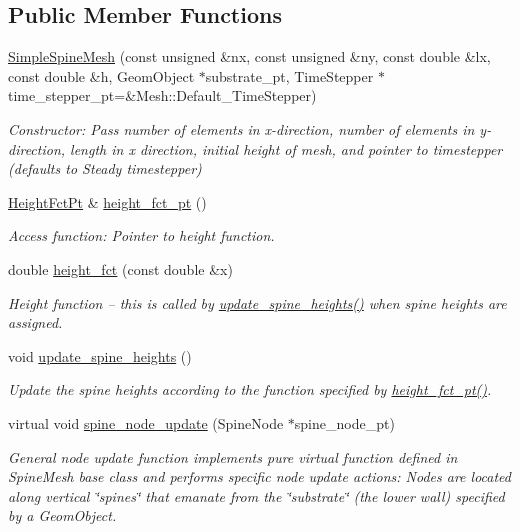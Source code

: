 \subsection*{Public Member Functions}
\begin{DoxyCompactItemize}
\item 
\hyperlink{classSimpleSpineMesh_a69815e3a950e6e5ede2f85004796dadb}{Simple\+Spine\+Mesh} (const unsigned \&nx, const unsigned \&ny, const double \&lx, const double \&h, Geom\+Object $\ast$substrate\+\_\+pt, Time\+Stepper $\ast$time\+\_\+stepper\+\_\+pt=\&Mesh\+::\+Default\+\_\+\+Time\+Stepper)
\begin{DoxyCompactList}\small\item\em Constructor\+: Pass number of elements in x-\/direction, number of elements in y-\/direction, length in x direction, initial height of mesh, and pointer to timestepper (defaults to Steady timestepper) \end{DoxyCompactList}\item 
\hyperlink{classSimpleSpineMesh_a671d96f0143dfeb7aaba8af56c0c0620}{Height\+Fct\+Pt} \& \hyperlink{classSimpleSpineMesh_af84290225b4aea3fd6ba27ad979059a0}{height\+\_\+fct\+\_\+pt} ()
\begin{DoxyCompactList}\small\item\em Access function\+: Pointer to height function. \end{DoxyCompactList}\item 
double \hyperlink{classSimpleSpineMesh_a99398fc7ef50db36d30f6c1d01aa3758}{height\+\_\+fct} (const double \&x)
\begin{DoxyCompactList}\small\item\em Height function -- this is called by \hyperlink{classSimpleSpineMesh_a2248fb8df448b0a02377a0cfb6f57851}{update\+\_\+spine\+\_\+heights()} when spine heights are assigned. \end{DoxyCompactList}\item 
void \hyperlink{classSimpleSpineMesh_a2248fb8df448b0a02377a0cfb6f57851}{update\+\_\+spine\+\_\+heights} ()
\begin{DoxyCompactList}\small\item\em Update the spine heights according to the function specified by \hyperlink{classSimpleSpineMesh_af84290225b4aea3fd6ba27ad979059a0}{height\+\_\+fct\+\_\+pt()}. \end{DoxyCompactList}\item 
virtual void \hyperlink{classSimpleSpineMesh_a4735e047eab146cafc3090f829373ef2}{spine\+\_\+node\+\_\+update} (Spine\+Node $\ast$spine\+\_\+node\+\_\+pt)
\begin{DoxyCompactList}\small\item\em General node update function implements pure virtual function defined in Spine\+Mesh base class and performs specific node update actions\+: Nodes are located along vertical \char`\"{}spines\char`\"{} that emanate from the \char`\"{}substrate\char`\"{} (the lower wall) specified by a Geom\+Object. \end{DoxyCompactList}\end{DoxyCompactItemize}

